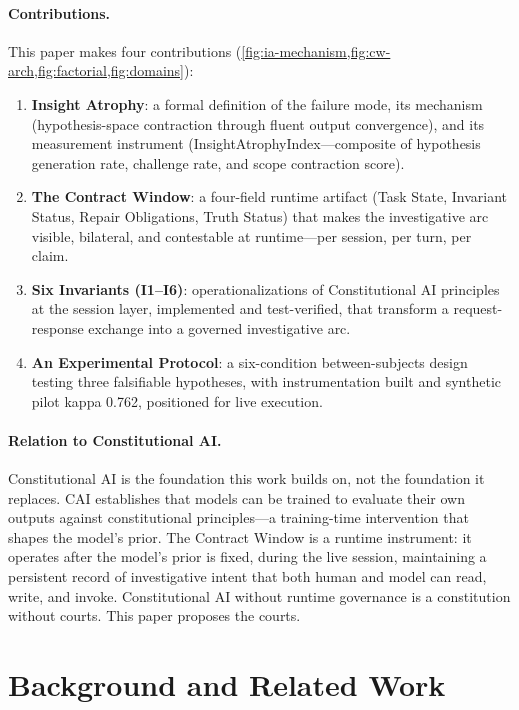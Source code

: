 \documentclass{article}
\newcommand{\cw}{Contract Window\xspace}
\newcommand{\ia}{Insight Atrophy\xspace}
\newcommand{\iai}{InsightAtrophyIndex\xspace}
\newcommand{\cai}{Constitutional AI\xspace}
\begin{document}
\paragraph{Contributions.} This paper makes four contributions (\cref{fig:ia-mechanism,fig:cw-arch,fig:factorial,fig:domains}):

\begin{enumerate}
\item \textbf{\ia}: a formal definition of the failure mode, its mechanism
(hypothesis-space contraction through fluent output convergence), and its
measurement instrument (\iai{}---composite of hypothesis generation rate,
challenge rate, and scope contraction score).

\item \textbf{The \cw}: a four-field runtime artifact (Task State, Invariant
Status, Repair Obligations, Truth Status) that makes the investigative arc
visible, bilateral, and contestable at runtime---per session, per turn, per
claim.

\item \textbf{Six Invariants (I1--I6)}: operationalizations of \cai{}
principles at the session layer, implemented and test-verified, that transform
a request-response exchange into a governed investigative arc.

\item \textbf{An Experimental Protocol}: a six-condition between-subjects
design testing three falsifiable hypotheses, with instrumentation built and
synthetic pilot kappa 0.762, positioned for live execution.
\end{enumerate}

\paragraph{Relation to \cai.} \cai{} \citep{bai2022constitutional} is the
foundation this work builds on, not the foundation it replaces. CAI establishes
that models can be trained to evaluate their own outputs against constitutional
principles---a training-time intervention that shapes the model's prior. The
\cw{} is a runtime instrument: it operates after the model's prior is fixed,
during the live session, maintaining a persistent record of investigative intent
that both human and model can read, write, and invoke. \cai{} without runtime
governance is a constitution without courts. This paper proposes the courts.

\section{Background and Related Work}
\label{sec:background}
\end{document}

